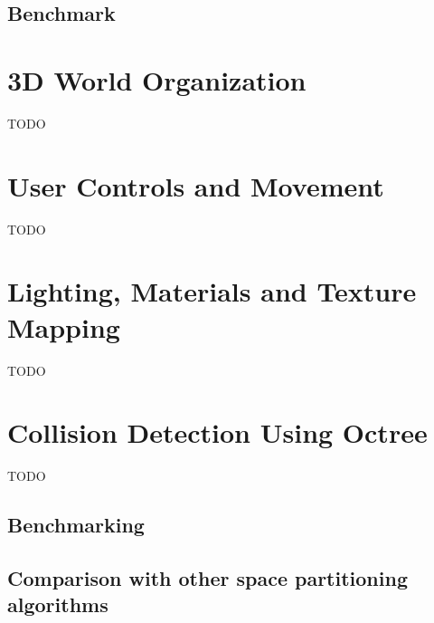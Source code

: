\documentclass{article}
\begin{document}
\subsection{Benchmark}


\section{3D World Organization}
TODO

\section{User Controls and Movement}
TODO

\section{Lighting, Materials and Texture Mapping}
TODO

\section{Collision Detection Using Octree}
TODO

\subsection{Benchmarking}

\subsection{Comparison with other space partitioning algorithms}

% 
% 
\end{document}
